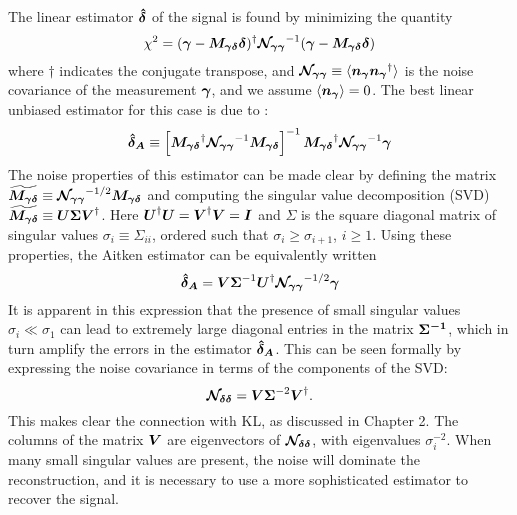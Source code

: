 The linear estimator $\boldsymbol{\hat{\delta}}$ of the signal is found by 
minimizing the quantity
\begin{equation}
  \chi^2 = (\boldsymbol{\gamma}-\boldsymbol{M_{\gamma\delta}}\boldsymbol{\delta})^\dagger 
  \boldsymbol{\mathcal{N}_{\gamma\gamma}}^{-1} (\boldsymbol{\gamma}-\boldsymbol{M_{\gamma\delta}}\boldsymbol{\delta})
\end{equation}
where $\dagger$ indicates the conjugate transpose, and 
$\boldsymbol{\mathcal{N}_{\gamma\gamma}} \equiv 
\langle \boldsymbol{n_\gamma}\boldsymbol{n_\gamma}^\dagger\rangle$
is the noise covariance of the measurement $\boldsymbol{\gamma}$,
and we assume $\langle \boldsymbol{n_\gamma}\rangle = 0$.  The best linear
unbiased estimator for this case is due to \citet{Aitken34}: 
\begin{equation}
  \label{Aitken_estimator}
  \boldsymbol{\hat{\delta}_A} \equiv
  \left[\boldsymbol{M_{\gamma\delta}}^\dagger
    \boldsymbol{\mathcal{N}_{\gamma\gamma}}^{-1}\boldsymbol{M_{\gamma\delta}}\right]^{-1}
  \boldsymbol{M_{\gamma\delta}}^\dagger
  \boldsymbol{\mathcal{N}_{\gamma\gamma}}^{-1}\boldsymbol{\gamma}
\end{equation}
The noise properties of this estimator can be made clear by
defining the matrix
$\boldsymbol{\widetilde{M_{\gamma\delta}}}\equiv 
\boldsymbol{\mathcal{N}_{\gamma\gamma}}^{-1/2}\boldsymbol{M_{\gamma\delta}}$ and
computing the singular value decomposition (SVD)
$\boldsymbol{\widetilde{M_{\gamma\delta}}} 
\equiv \boldsymbol{U}\boldsymbol{\Sigma}\boldsymbol{V}^\dagger$.
Here $\boldsymbol{U}^\dagger \boldsymbol{U} = \boldsymbol{V}^\dagger \boldsymbol{V} = \boldsymbol{I}$ 
and $\Sigma$ is the square diagonal matrix of singular values 
$\sigma_i\equiv\Sigma_{ii}$, ordered such that $\sigma_i\ge\sigma_{i+1}$, 
$i\ge 1$.  Using these properties, the Aitken estimator can be equivalently 
written
\begin{equation}
  \label{Aitken_SVD}
  \boldsymbol{\hat{\delta}_A} = \boldsymbol{V} \boldsymbol{\Sigma}^{-1} 
  \boldsymbol{U}^\dagger \boldsymbol{\mathcal{N}_{\gamma\gamma}}^{-1/2} \boldsymbol{\gamma}
\end{equation}
It is apparent in this expression that the presence of small singular values 
$\sigma_i \ll \sigma_1$ can lead to extremely large diagonal entries 
in the matrix $\boldsymbol{\Sigma^{-1}}$, which in turn amplify the errors in the
estimator $\boldsymbol{\hat{\delta}_A}$. 
This can be seen formally by expressing the noise covariance
in terms of the components of the SVD:
\begin{equation}
  \label{Ndd_decomp}
  \boldsymbol{\mathcal{N}_{\delta\delta}} = 
  \boldsymbol{V}\boldsymbol{\Sigma}^{-2}\boldsymbol{V}^\dagger.
\end{equation}
This makes clear the connection with KL, as discussed in Chapter 2.
The columns of the matrix $\boldsymbol{V}$ are eigenvectors of
$\boldsymbol{\mathcal{N}_{\delta\delta}}$, with eigenvalues $\sigma_i^{-2}$.
When many small singular values are present, the noise will dominate
the reconstruction, and it is necessary to 
use a more sophisticated estimator to recover the signal.

